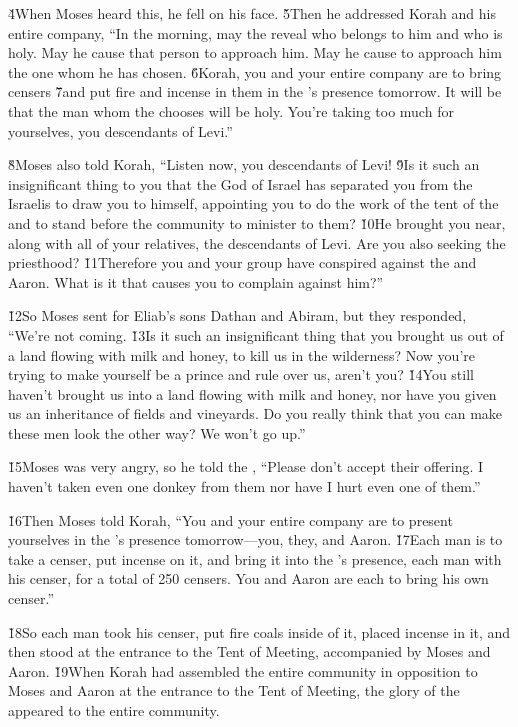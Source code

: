\v{4}When Moses heard this, he fell on his face. \v{5}Then he addressed Korah and his entire company, ``In the morning, may the  reveal who belongs to him and who is holy. May he cause that person to approach him. May he cause to approach him the one whom he has chosen. \v{6}Korah, you and your entire company are to bring censers \v{7}and put fire and incense in them in the 's presence tomorrow. It will be that the man whom the  chooses will be holy. You're taking too much for yourselves, you descendants of Levi.''

\v{8}Moses also told Korah, ``Listen now, you descendants of Levi! \v{9}Is it such an insignificant thing to you that the God of Israel has separated you from the Israelis to draw you to himself, appointing you to do the work of the tent of the  and to stand before the community to minister to them? \v{10}He brought you near, along with all of your relatives, the descendants of Levi. Are you also seeking the priesthood? \v{11}Therefore you and your group have conspired against the  and Aaron. What is it that causes you to complain against him?''

\v{12}So Moses sent for Eliab's sons Dathan and Abiram, but they responded, ``We're not coming. \v{13}Is it such an insignificant thing that you brought us out of a land flowing with milk and honey, to kill us in the wilderness? Now you're trying to make yourself be a prince and rule over us, aren't you? \v{14}You still haven't brought us into a land flowing with milk and honey, nor have you given us an inheritance of fields and vineyards. Do you really think that you can make these men look the other way? We won't go up.''

\v{15}Moses was very angry, so he told the , ``Please don't accept their offering. I haven't taken even one donkey from them nor have I hurt even one of them.''

\v{16}Then Moses told Korah, ``You and your entire company are to present yourselves in the 's presence tomorrow---you, they, and Aaron. \v{17}Each man is to take a censer, put incense on it, and bring it into the 's presence, each man with his censer, for a total of 250 censers. You and Aaron are each to bring his own censer.''

\v{18}So each man took his censer, put fire coals inside of it, placed incense in it, and then stood at the entrance to the Tent of Meeting, accompanied by Moses and Aaron. \v{19}When Korah had assembled the entire community in opposition to Moses and Aaron at the entrance to the Tent of Meeting, the glory of the  appeared to the entire community.

